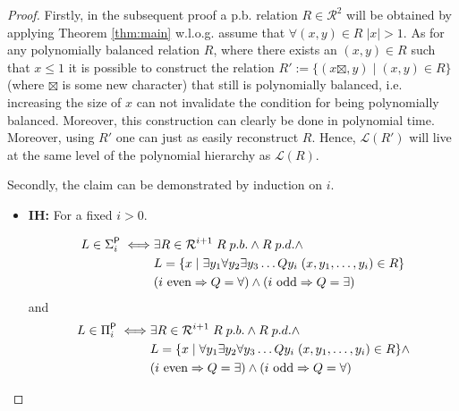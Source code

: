 \documentclass [11pt]{article}
\newcommand{\ccfont}[1]{\protect\mathsf{#1}}
\newcommand{\Ptime}{\ccfont{P}}
\newcommand{\phs}[1]{\Sigma_{#1}^{\Ptime}}
\newcommand{\php}[1]{\Pi_{#1}^{\Ptime}}
\newcommand{\sto}{\Rightarrow}
\begin{document}
\begin{proof}
Firstly, in the subsequent proof a p.b. relation $R \in \mathcal{R}^2$ will be obtained  by applying Theorem \ref{thm:main} w.l.o.g. assume that $\forall (x,y) \in R \; |x|>1$. As for any polynomially balanced relation $R$, where there exists an $(x,y) \in R$ such that $x\leq 1$ it is possible to construct the relation $R':=\{( x\boxtimes , y) \mid (x,y) \in R\}$ (where $\boxtimes$ is some new character) that still is polynomially balanced, i.e. increasing the size of $x$ can not invalidate the condition for being polynomially balanced. Moreover, this construction can clearly be done in polynomial time. Moreover, using $R'$ one can just as easily reconstruct $R$. Hence, $\mathcal{L}(R')$ will live at the same level of the polynomial hierarchy as $\mathcal{L}(R)$.


Secondly, the claim can be demonstrated by induction on $i$.

\begin{itemize}
\item \textbf{IH:} For a fixed $i>0$.

\begin{equation*}
\begin{split}
L \in \phs{i} \iff & \exists R  \in  \mathcal{R}^{i+1} \; R \; p.b. \land R \; p.d. \land  \\
&L = \{x \mid \exists y_1 \forall y_2\exists y_3\dots Q y_i  \; (x,y_1,\ldots,y_i) \in R\}
\\
& (i \text{ even}  \sto Q=\forall) \land (i \text{ odd}  \sto Q=\exists) 
\end{split}
\end{equation*}
and 
\begin{equation*}
\begin{split}
L \in \php{i} \iff & \exists R  \in  \mathcal{R}^{i+1} \; R \; p.b. \land R \; p.d. \land  \\
&L = \{x \mid \forall y_1 \exists y_2\forall y_3\dots Q y_i  \; (x,y_1,\ldots,y_i) \in R\} \land \\
& (i \text{ even}  \sto Q=\exists) \land (i \text{ odd}  \sto Q=\forall) 
\end{split}
\end{equation*}



\end{itemize}
\end{proof}
\end{document}
